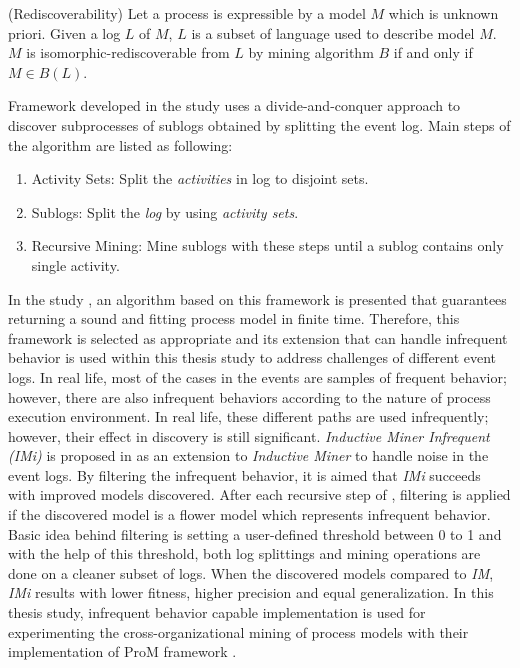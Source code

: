 \theoremstyle{definition}
\begin{definition}{}
(Rediscoverability) Let a process is expressible by a model $M$ which is unknown priori. Given a log $L$ of $M$, $L$ is a subset of language used to describe model $M$. $M$ is isomorphic-rediscoverable from $L$ by mining algorithm $B$ if and only if $M \in B(L)$.
\end{definition}
 
Framework developed in the study \cite{leemans2013discovering} uses a divide-and-conquer approach to discover subprocesses of sublogs obtained by splitting the event log. Main steps of the algorithm are listed as following:
\begin{enumerate}
  \item Activity Sets: Split the \textit{activities} in log to disjoint sets.
  \item Sublogs: Split the \textit{log} by using \textit{activity sets}.
  \item Recursive Mining: Mine sublogs with these steps until a sublog contains only single activity.
\end{enumerate}

In the study \cite{leemans2013discovering}, an algorithm based on this framework is presented that guarantees returning a sound and fitting process model in finite time. Therefore, this framework is selected as appropriate and its extension that can handle infrequent behavior is used within this thesis study to address challenges of different event logs. In real life, most of the cases in the events are samples of frequent behavior; however, there are also infrequent behaviors according to the nature of process execution environment. In real life, these different paths are used infrequently; however, their effect in discovery is still significant. \textit{Inductive Miner Infrequent (IMi)} is proposed in \cite{leemans2014discoveringinfrequent} as an extension to \textit{Inductive Miner} to handle noise in the event logs. By filtering the infrequent behavior, it is aimed that \textit{IMi} succeeds with improved models discovered. After each recursive step of , filtering is applied if the discovered model is a flower model which represents infrequent behavior. Basic idea behind filtering is setting a user-defined threshold between 0 to 1 and with the help of this threshold, both log splittings and mining operations are done on a cleaner subset of logs. When the discovered models compared to \textit{IM}, \textit{IMi} results with lower fitness, higher precision and equal generalization.
In this thesis study, infrequent behavior capable implementation is used for experimenting the cross-organizational mining of process models with their implementation of ProM framework \cite{verbeek2010prom}.


